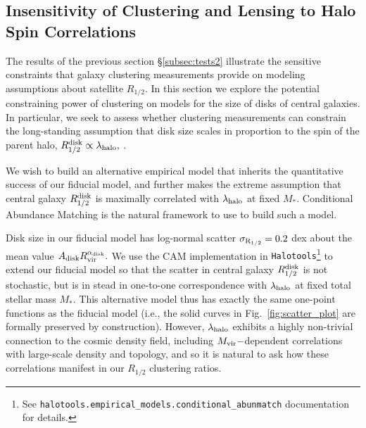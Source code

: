 \documentclass[usenatbib,usegraphicx,letterpaper]{mn2e}
\newcommand{\rhalf}{R_{1/2}}
\newcommand{\rhalfdisk}{R_{1/2}^{\rm disk}}
\newcommand{\adisk}{A_{\rm disk}}
\newcommand{\alphadisk}{\alpha_{\rm disk}}
\newcommand{\sigmarhalf}{\sigma_{\rm R_{1/2}}}
\newcommand{\mstar}{M_{\ast}}
\newcommand{\halospin}{\lambda_{\rm halo}}
\newcommand{\mvir}{M_{\rm vir}}
\newcommand{\rvir}{R_{\rm vir}}
\begin{document}
\subsection{Insensitivity of Clustering and Lensing to Halo Spin Correlations}
\label{subsec:tests3}

The results of the previous section \S\ref{subsec:tests2} illustrate the sensitive constraints that galaxy clustering measurements provide on modeling assumptions about satellite $\rhalf.$ In this section we explore the potential constraining power of clustering on models for the size of disks of central galaxies. In particular, we seek to assess whether clustering measurements can constrain the long-standing assumption that disk size scales in proportion to the spin of the parent halo, $\rhalfdisk\propto\halospin,$ \citep[e.g.,][]{mo_mao_white98}.

We wish to build an alternative empirical model that inherits the quantitative success of our fiducial model, and further makes the extreme assumption that central galaxy $\rhalfdisk$ is maximally correlated with $\halospin$ at fixed $\mstar.$ Conditional Abundance Matching \citep[hereafter, CAM,][]{hearin_etal13b} is the natural framework to use to build such a model.

Disk size in our fiducial model has log-normal scatter $\sigmarhalf=0.2$ dex about the mean value $\adisk\rvir^{\alphadisk}.$  We use the CAM implementation in {\tt Halotools}\footnote{See {\tt halotools.empirical\_models.conditional\_abunmatch} documentation for details.} to extend our fiducial model so that the scatter in central galaxy $\rhalfdisk$ is not stochastic, but is in stead in one-to-one correspondence with $\halospin$ at fixed total stellar mass $\mstar.$ This alternative model thus has exactly the same one-point functions as the fiducial model (i.e., the solid curves in Fig.~\ref{fig:scatter_plot} are formally preserved by construction). However, $\halospin$ exhibits a highly non-trivial connection to the cosmic density field, including $\mvir-$dependent correlations with large-scale density and topology, and so it is natural to ask how these correlations manifest in our $\rhalf$ clustering ratios.
\end{document}
